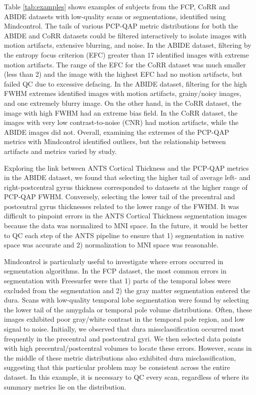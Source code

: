 Table \ref{tab:examples} shows examples of subjects from the FCP, CoRR and ABIDE datasets with low-quality scans or segmentations, identified using Mindcontrol. The tails of various PCP-QAP metric distributions for both the ABIDE and CoRR datasets could be filtered interactively to isolate images with motion artifacts, extensive blurring, and noise. In the ABIDE dataset, filtering by the entropy focus criterion (EFC) greater than 17 identified images with extreme motion artifacts. The range of the EFC for the CoRR dataset was much smaller (less than 2) and the image with the highest EFC had no motion artifacts, but failed QC due to excessive defacing. In the ABIDE dataset, filtering for the high FWHM extremes identified images with motion artifacts, grainy/noisy images, and one extremely blurry image. On the other hand, in the CoRR dataset, the image with high FWHM had an extreme bias field. In the CoRR dataset, the images with very low contrast-to-noise (CNR) had motion artifacts, while the ABIDE images did not. Overall, examining the extremes of the PCP-QAP metrics with Mindcontrol identified outliers, but the relationship between artifacts and metrics varied by study.

Exploring the link between ANTS Cortical Thickness and the PCP-QAP metrics in the ABIDE dataset, we found that selecting the higher tail of average left- and right-postcentral gyrus thickness corresponded to datasets at the higher range of PCP-QAP FWHM. Conversely, selecting the lower tail of the precentral and postcentral gyrus thicknesses related to the lower range of the FWHM. It was difficult to pinpoint errors in the ANTS Cortical Thickness segmentation images because the data was normalized to MNI space. In the future, it would be better to QC each step of the ANTS pipeline to ensure that 1) segmentation in native space was accurate and 2) normalization to MNI space was reasonable.

Mindcontrol is particularly useful to investigate where errors occurred in segmentation algorithms. In the FCP dataset, the most common errors in segmentation with Freesurfer were that 1) parts of the temporal lobes were excluded from the segmentation and 2) the gray matter segmentation entered the dura. Scans with low-quality temporal lobe segmentation were found by selecting the lower tail of the amygdala or temporal pole volume distributions. Often, these images exhibited poor gray/white contrast in the temporal pole region, and low signal to noise. Initially, we observed that dura missclassification occurred most frequently in the precentral and postcentral gyri. We then selected data points with high precentral/postcentral volumes to locate these errors. However, scans in the middle of these metric distributions also exhibited dura misclassification, suggesting that this particular problem may be consistent across the entire dataset. In this example, it is necessary to QC every scan, regardless of where its summary metrics lie on the distribution.  

